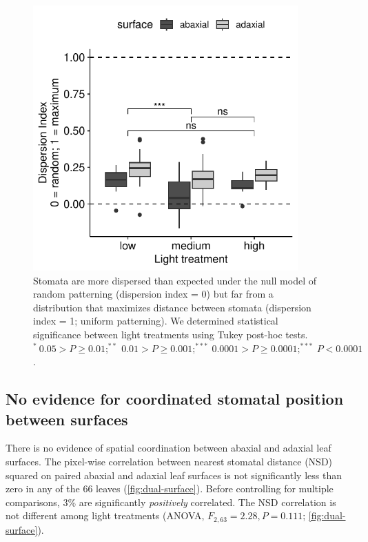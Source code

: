 \documentclass[webpdf,large,modern,unnumsec,namedate]{oup-authoring-template}
\begin{document}
\begin{figure}[ht]
\includegraphics[width=4in]{figures/single-surface.pdf}
\caption{Stomata are more dispersed than expected under the null model of random patterning (dispersion index = 0) but far from a distribution that maximizes distance between stomata (dispersion index = 1; uniform patterning). We determined statistical significance between light treatments using Tukey post-hoc tests. $^*~0.05 > P \ge 0.01; ^{**}~0.01 > P \ge 0.001; ^{***}~0.0001 > P \ge 0.0001; ^{***}~ P <0.0001$.}
\label{fig:single-surface}
\end{figure}

\subsection{No evidence for coordinated stomatal position between
surfaces}\label{no-evidence-for-coordinated-stomatal-position-between-surfaces}

There is no evidence of spatial coordination between abaxial and adaxial
leaf surfaces. The pixel-wise correlation between nearest stomatal
distance (NSD) squared on paired abaxial and adaxial leaf surfaces is
not significantly less than zero in any of the 66 leaves
(\autoref{fig:dual-surface}). Before controlling for multiple
comparisons, 3\% are significantly \emph{positively} correlated. The NSD
correlation is not different among light treatments (ANOVA,
\(F_{2,63} = 2.28, P = 0.111\); \autoref{fig:dual-surface}).
\end{document}
